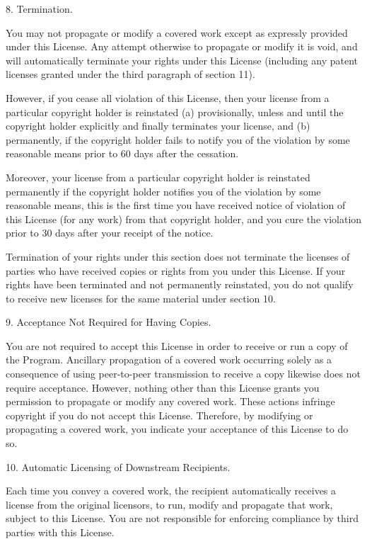   8. Termination.

  You may not propagate or modify a covered work except as expressly
provided under this License.  Any attempt otherwise to propagate or
modify it is void, and will automatically terminate your rights under
this License (including any patent licenses granted under the third
paragraph of section 11).

  However, if you cease all violation of this License, then your
license from a particular copyright holder is reinstated (a)
provisionally, unless and until the copyright holder explicitly and
finally terminates your license, and (b) permanently, if the copyright
holder fails to notify you of the violation by some reasonable means
prior to 60 days after the cessation.

  Moreover, your license from a particular copyright holder is
reinstated permanently if the copyright holder notifies you of the
violation by some reasonable means, this is the first time you have
received notice of violation of this License (for any work) from that
copyright holder, and you cure the violation prior to 30 days after
your receipt of the notice.

  Termination of your rights under this section does not terminate the
licenses of parties who have received copies or rights from you under
this License.  If your rights have been terminated and not permanently
reinstated, you do not qualify to receive new licenses for the same
material under section 10.

  9. Acceptance Not Required for Having Copies.

  You are not required to accept this License in order to receive or
run a copy of the Program.  Ancillary propagation of a covered work
occurring solely as a consequence of using peer-to-peer transmission
to receive a copy likewise does not require acceptance.  However,
nothing other than this License grants you permission to propagate or
modify any covered work.  These actions infringe copyright if you do
not accept this License.  Therefore, by modifying or propagating a
covered work, you indicate your acceptance of this License to do so.

  10. Automatic Licensing of Downstream Recipients.

  Each time you convey a covered work, the recipient automatically
receives a license from the original licensors, to run, modify and
propagate that work, subject to this License.  You are not responsible
for enforcing compliance by third parties with this License.

